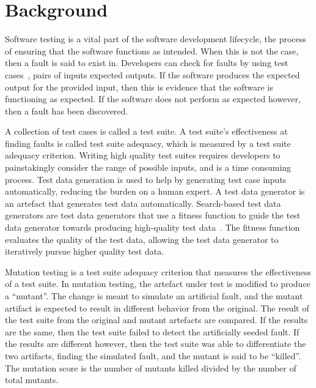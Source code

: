 \section{Background}\label{sec:background}
Software testing is a vital part of the software development lifecycle, the
process of ensuring that the software functions as intended.  When this is not the case, then a fault
is said to exist in. Developers can check for faults by using test cases~\cite{ammann2008}, pairs of inputs 
expected outputs. If the software produces the expected output for the provided input, then this is evidence
that the software is functioning as expected.  If the software does not perform as expected however, then a
fault has been discovered.

A collection of test cases is called a test suite. A test suite's effectiveness at finding faults is
called test suite adequacy, which is measured by a test suite adequacy criterion.
Writing high quality test suites requires developers to painstakingly consider the
range of possible inputs, and is a time consuming process. Test data generation is used to
help by generating test case inputs automatically, reducing the burden on a human expert. A test data
generator is an artefact that generates test data automatically.
Search-based test data generators are test data generators that use a fitness function to guide the
test data generator towards producing high-quality test data~\cite{STVR:STVR294}. The fitness function evaluates the
quality of the test data, allowing the test data generator to iteratively pursue higher quality test 
data.

Mutation testing is a test suite adequacy criterion that measures the effectiveness of a test suite. In
mutation testing, the artefact under test is modified to produce a ``mutant''. The
change is meant to simulate an artificial fault, and the mutant artifact is expected to result in
different behavior from the original. The result of the test suite from the original and mutant
artefacts are compared. If the results are the same, then the test suite failed to detect the
artificially seeded fault. If the results are different however, then the test suite was able to
differentiate the two artifacts, finding the simulated fault, and the mutant is said to be ``killed''.
The mutation score is the number of mutants killed divided by the number of total mutants.



